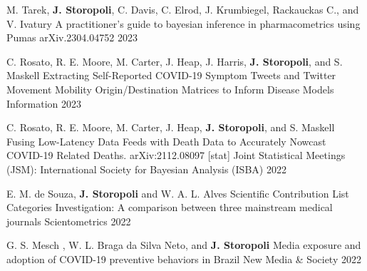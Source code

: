 

\begin{cventries}

	\cventry
	{M. Tarek, \textbf{J. Storopoli}, C. Davis, C. Elrod, J. Krumbiegel, Rackauckas C., and V. Ivatury} %
	{A practitioner's guide to bayesian inference in pharmacometrics using Pumas} %
	{arXiv.2304.04752} %
	{2023} %
	
	\cventry
	{C. Rosato, R. E. Moore, M. Carter, J. Heap, J. Harris, \textbf{J. Storopoli}, and S. Maskell} %
	{Extracting Self-Reported COVID-19 Symptom Tweets and Twitter Movement Mobility Origin/Destination Matrices to Inform Disease Models} %
	{Information} %
	{2023} %

	\cventry
	{C. Rosato, R. E. Moore, M. Carter, J. Heap, \textbf{J. Storopoli}, and S. Maskell} %
	{Fusing Low-Latency Data Feeds with Death Data to Accurately Nowcast COVID-19 Related Deaths. arXiv:2112.08097 [stat]} %
	{Joint Statistical Meetings (JSM): International Society for Bayesian Analysis (ISBA)} %
	{2022} %

	\cventry
	{E. M. de Souza, \textbf{J. Storopoli} and W. A. L. Alves} %
	{Scientific Contribution List Categories Investigation: A comparison between three mainstream medical journals} %
	{Scientometrics} %
	{2022} %

	\cventry
	{G. S. Mesch , W. L. Braga da Silva Neto, and \textbf{J. Storopoli}} %
	{Media exposure and adoption of COVID-19 preventive behaviors in Brazil} %
	{New Media \& Society} %
	{2022} %

\end{cventries}
